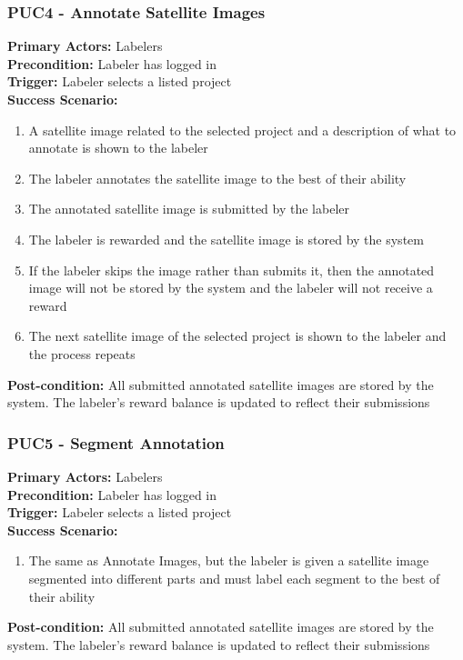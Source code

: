 \documentclass[12pt]{article}
\begin{document}
\subsubsection*{PUC4 - Annotate Satellite Images}
\label{sec:PUC4}
\textbf{Primary Actors:} Labelers\\ 
\textbf{Precondition:} Labeler has logged in\\
\textbf{Trigger:} Labeler selects a listed project\\
\textbf{Success Scenario:}
\begin{enumerate}
    \item A satellite image related to the selected project and a description of what to annotate is shown to the labeler
    \item The labeler annotates the satellite image to the best of their ability
    \item The annotated satellite image is submitted by the labeler
    \item The labeler is rewarded and the satellite image is stored by the system
    \item If the labeler skips the image rather than submits it, then the annotated image will not be stored by the system and the labeler will not receive a reward
    \item The next satellite image of the selected project is shown to the labeler and the process repeats
\end{enumerate}
\textbf{Post-condition:} All submitted annotated satellite images are stored by the system. The labeler's reward balance is updated to reflect their submissions

\subsubsection*{PUC5 - Segment Annotation}
\label{sec:PUC5}
\textbf{Primary Actors:} Labelers\\ 
\textbf{Precondition:} Labeler has logged in\\
\textbf{Trigger:} Labeler selects a listed project\\
\textbf{Success Scenario:}
\begin{enumerate}
    \item The same as Annotate Images, but the labeler is given a satellite image segmented into different parts and must label each segment to the best of their ability 
\end{enumerate}
\textbf{Post-condition:} All submitted annotated satellite images are stored by the system. The labeler's reward balance is updated to reflect their submissions
\end{document}
